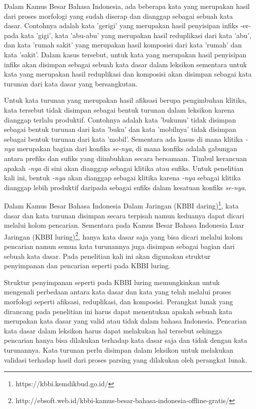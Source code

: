 Dalam Kamus Besar Bahasa Indonesia, ada beberapa kata yang merupakan hasil dari proses morfologi yang sudah diserap dan dianggap sebagai sebuah kata dasar. Contohnya adalah kata 'gerigi' yang merupakan hasil penyisipan infiks -er- pada kata 'gigi', kata 'abu-abu' yang merupakan hasil reduplikasi dari kata 'abu', dan kata 'rumah sakit' yang merupakan hasil komposisi dari kata 'rumah' dan kata 'sakit'. Dalam kasus tersebut, untuk kata yang merupakan hasil penyisipan infiks akan disimpan sebagai sebuah kata dasar dalam leksikon sementara untuk kata yang merupakan hasil reduplikasi dan komposisi akan disimpan sebagai kata turunan dari kata dasar yang bersangkutan.

Untuk kata turunan yang merupakan hasil afiksasi berupa pengimbuhan klitika, kata tersebut tidak disimpan sebagai bentuk turunan dalam leksikon karena dianggap terlalu produktif. Contohnya adalah kata 'bukumu' tidak disimpan sebagai bentuk turunan dari kata 'buku' dan kata 'mobilnya' tidak disimpan sebagai bentuk turunan dari kata 'mobil'. Sementara ada kasus di mana klitika \textit{-nya} merupakan bagian dari konfiks \textit{se-nya}, di mana konfiks adalah gabungan antara prefiks dan sufiks yang diimbuhkan secara bersamaan. Timbul kerancuan apakah \textit{-nya} di sini akan dianggap sebagai klitika atau sufiks. Untuk penelitian kali ini, bentuk \textit{-nya} akan dianggap sebagai klitika karena \textit{-nya} sebagai klitika dianggap lebih produktif daripada sebagai sufiks dalam kesatuan konfiks \textit{se-nya}.

Dalam Kamus Besar Bahasa Indonesia Dalam Jaringan (KBBI daring)\footnote{https://kbbi.kemdikbud.go.id/}, kata dasar dan kata turunan disimpan secara terpisah namun keduanya dapat dicari melalui kolom pencarian. Sementara pada Kamus Besar Bahasa Indonesia Luar Jaringan (KBBI luring)\footnote{http://ebsoft.web.id/kbbi-kamus-besar-bahasa-indonesia-offline-gratis/}, hanya kata dasar saja yang bisa dicari melalui kolom pencarian namun semua kata turunannya juga disimpan sebagai bagian dari sebuah kata dasar. Pada penelitian kali ini akan digunakan struktur penyimpanan dan pencarian seperti pada KBBI luring.

Struktur penyimpanan seperti pada KBBI luring memungkinkan untuk mengenali perbedaan antara kata dasar dan kata yang telah melalui proses morfologi seperti afiksasi, reduplikasi, dan komposisi. Perangkat lunak yang dirancang pada penelitian ini harus dapat menentukan apakah sebuah kata merupakan kata dasar yang valid atau tidak dalam bahasa Indonesia. Pencarian kata dasar dalam leksikon harus dapat melakukan hal tersebut sehingga pencarian hanya bisa dilakukan terhadap kata dasar saja dan tidak dengan kata turunannya. Kata turunan perlu disimpan dalam leksikon untuk melakukan validasi terhadap hasil dari proses parsing yang dilakukan oleh perangkat lunak. %


